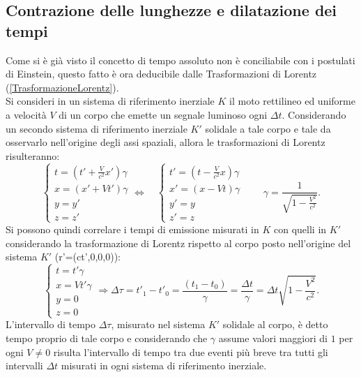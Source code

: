 \subsection{Contrazione delle lunghezze e dilatazione dei tempi}\label{sec:ContrazioneDilatazione}
Come si è già visto il concetto di tempo assoluto non è conciliabile con i postulati di Einstein, questo fatto è ora deducibile dalle Trasformazioni di Lorentz (\ref{TrasformazioneLorentz}).\\
Si consideri in un sistema di riferimento inerziale $K$ il moto rettilineo ed uniforme a velocità $V$ di un corpo che emette un segnale luminoso ogni $\Delta t$. Considerando un secondo sistema di riferimento inerziale $K'$ solidale a tale corpo e tale da osservarlo nell'origine degli assi spaziali, allora le trasformazioni di Lorentz risulteranno:
\begin{equation*}
    \begin{cases}
        t=(t'+\frac{V}{c^2}x')\gamma\\
        x=(x'+Vt')\gamma\\
        y=y'\\
        z=z'
    \end{cases}
    \Longleftrightarrow \quad
    \begin{cases}
        t'=(t-\frac{V}{c^2}x)\gamma\\
        x'=(x-Vt)\gamma\\
        y'=y\\
        z'=z
    \end{cases}
    \qquad \gamma=\frac{1}{\sqrt{1-\frac{V^2}{c^2}}}.
\end{equation*}
Si possono quindi correlare i tempi di emissione misurati in $K$ con quelli in $K'$ considerando la trasformazione di Lorentz rispetto al corpo posto nell'origine del sistema $K'$ (r'=(ct',0,0,0)): 
\begin{equation}
    \begin{cases}
        t=t'\gamma\\
        x=Vt'\gamma\\
        y=0\\
        z=0
    \end{cases}
    \Rightarrow \Delta \tau=t'_1-t'_0=\frac{(t_1-t_0)}{\gamma}=\frac{\Delta t}{\gamma}=\Delta t \sqrt{1-\frac{V^2}{c^2}}.
    \label{dilatazioneTempi}
\end{equation}
L'intervallo di tempo $\Delta \tau$, misurato nel sistema $K'$ solidale al corpo, è detto tempo proprio di tale corpo e considerando che $\gamma$ assume valori maggiori di $1$ per ogni $V\neq 0$ risulta l'intervallo di tempo tra due eventi più breve tra tutti gli intervalli $\Delta t$ misurati in ogni sistema di riferimento inerziale.\\


